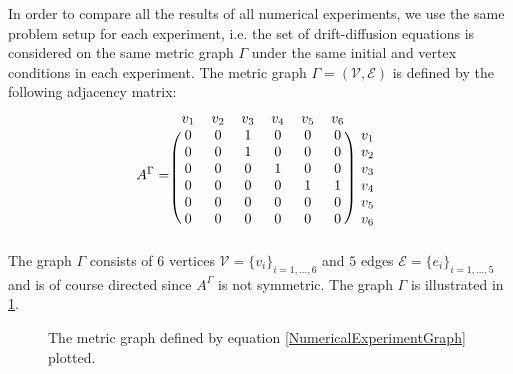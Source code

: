 In order to compare all the results of all numerical experiments, we use the same problem setup for each experiment, i.e. the set of drift-diffusion equations is considered on the same metric graph $\Gamma$ under the same initial and vertex conditions in each experiment. The metric graph $\Gamma = (\mathcal{V}, \mathcal{E})$ is defined by the following adjacency matrix: 
\begin{equation}
    \label{NumericalExperimentGraph}
    A^{\Gamma} = 
    \begin{blockarray}{ccccccc}
        v_1 & v_2 & v_3 & v_4 & v_5 & v_6 \\
        \begin{block}{(cccccc)c}
            0 & 0 & 1 & 0 & 0 & 0 & v_1 \\
            0 & 0 & 1 & 0 & 0 & 0 & v_2 \\
            0 & 0 & 0 & 1 & 0 & 0 & v_3 \\
            0 & 0 & 0 & 0 & 1 & 1 & v_4 \\
            0 & 0 & 0 & 0 & 0 & 0 & v_5 \\
            0 & 0 & 0 & 0 & 0 & 0 & v_6 \\
        \end{block}
    \end{blockarray}
\end{equation}
The graph $\Gamma$ consists of $6$ vertices $\mathcal{V} = \{ v_i \}_{i = 1,\ldots, 6}$ and $5$ edges $\mathcal{E} = \{ e_i \}_{i = 1,\ldots, 5}$ and is of course directed since $A^{\Gamma}$ is not symmetric. The graph $\Gamma$ is illustrated in \cref{fig7}. 
\begin{figure}[H]
    \begin{center}
    \end{center}
    \caption{The metric graph defined by equation \cref{NumericalExperimentGraph} plotted.}
    \label{fig7}
\end{figure}
